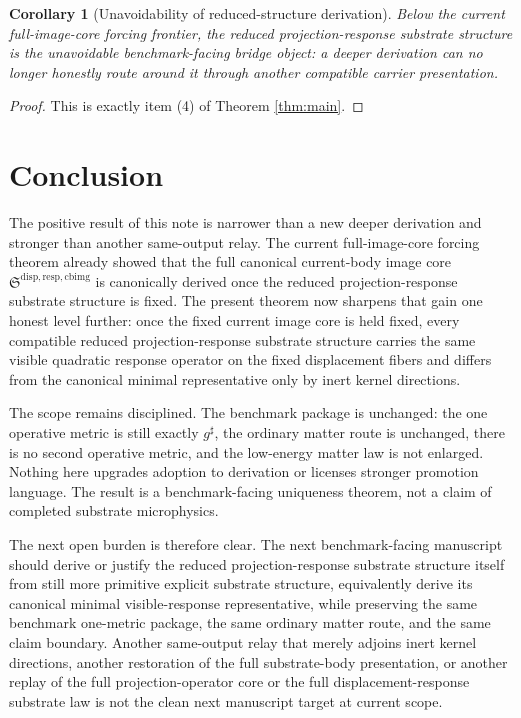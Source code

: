 \documentclass[11pt]{article}
\newcommand{\CompletedMetric}{g^{\sharp}}
\newcommand{\CurrentBodyImageCore}{\mathfrak S^{\mathrm{disp,resp,cbimg}}}
\newtheorem{corollary}{Corollary}
\begin{document}
\begin{corollary}[Unavoidability of reduced-structure derivation]
\label{cor:unavoidable}
Below the current full-image-core forcing frontier, the reduced projection-response substrate structure is the unavoidable benchmark-facing bridge object: a deeper derivation can no longer honestly route around it through another compatible carrier presentation.
\end{corollary}

\begin{proof}
This is exactly item (4) of Theorem \ref{thm:main}.
\end{proof}

\section{Conclusion}

The positive result of this note is narrower than a new deeper derivation and stronger than another same-output relay. The current full-image-core forcing theorem already showed that the full canonical current-body image core \(\CurrentBodyImageCore\) is canonically derived once the reduced projection-response substrate structure is fixed. The present theorem now sharpens that gain one honest level further: once the fixed current image core is held fixed, every compatible reduced projection-response substrate structure carries the same visible quadratic response operator on the fixed displacement fibers and differs from the canonical minimal representative only by inert kernel directions.

The scope remains disciplined. The benchmark package is unchanged: the one operative metric is still exactly \(\CompletedMetric\), the ordinary matter route is unchanged, there is no second operative metric, and the low-energy matter law is not enlarged. Nothing here upgrades adoption to derivation or licenses stronger promotion language. The result is a benchmark-facing uniqueness theorem, not a claim of completed substrate microphysics.

The next open burden is therefore clear. The next benchmark-facing manuscript should derive or justify the reduced projection-response substrate structure itself from still more primitive explicit substrate structure, equivalently derive its canonical minimal visible-response representative, while preserving the same benchmark one-metric package, the same ordinary matter route, and the same claim boundary. Another same-output relay that merely adjoins inert kernel directions, another restoration of the full substrate-body presentation, or another replay of the full projection-operator core or the full displacement-response substrate law is not the clean next manuscript target at current scope.
\end{document}

